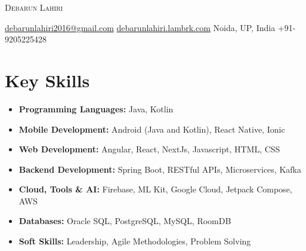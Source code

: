 \documentclass[10pt, a4paper]{article}
\begin{document}
\begin{center}
    {\Huge \scshape Debarun Lahiri}
    \vspace{1ex}
    
    \href{mailto:debarunlahiri2016@gmail.com}{debarunlahiri2016@gmail.com} \quad\textbar\quad
    \href{https://debarunlahiri-web.vercel.app/}{debarunlahiri.lambrk.com} \quad\textbar\quad Noida, UP, India \quad\textbar\quad
    +91-9205225428
\end{center}

\section*{Key Skills}
\begin{itemize}[leftmargin=*, label={}, itemsep=0.25ex]
    \item \textbf{Programming Languages:} Java, Kotlin
    \item \textbf{Mobile Development:} Android (Java and Kotlin), React Native, Ionic
    \item \textbf{Web Development:} Angular, React, NextJs, Javascript, HTML, CSS
    \item \textbf{Backend Development:} Spring Boot, RESTful APIs, Microservices, Kafka
    \item \textbf{Cloud, Tools \& AI:} Firebase, ML Kit, Google Cloud, Jetpack Compose, AWS
    \item \textbf{Databases:} Oracle SQL, PostgreSQL, MySQL, RoomDB
    \item \textbf{Soft Skills:} Leadership, Agile Methodologies, Problem Solving
\end{itemize}

\end{document}
